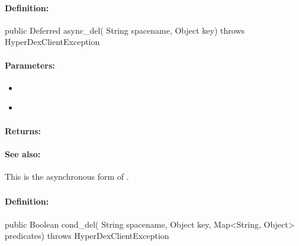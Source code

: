 \paragraph{Definition:}
\begin{javacode}
public Deferred async_del(
        String spacename,
        Object key) throws HyperDexClientException
\end{javacode}

\paragraph{Parameters:}
\begin{itemize}[noitemsep]
\item {}\\

\item {}\\

\end{itemize}

\paragraph{Returns:}


\paragraph{See also:}  This is the asynchronous form of .

\pagebreak
\subsubsection{}
\label{api:java:cond_del}


\paragraph{Definition:}
\begin{javacode}
public Boolean cond_del(
        String spacename,
        Object key,
        Map<String, Object> predicates) throws HyperDexClientException
\end{javacode}

